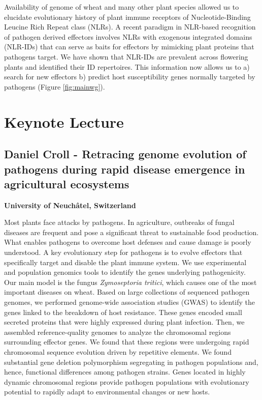 \documentclass[12pt,]{book}
\theoremstyle{definition}
\theoremstyle{definition}
\theoremstyle{remark}
\begin{document}
Availability of genome of wheat and many other plant species allowed us
to elucidate evolutionary history of plant immune receptors of
Nucleotide-Binding Leucine Rich Repeat class (NLRs). A recent paradigm
in NLR-based recognition of pathogen derived effectors involves NLRs
with exogenous integrated domains (NLR-IDs) that can serve as baits for
effectors by mimicking plant proteins that pathogens target. We have
shown that NLR-IDs are prevalent across flowering plants and identified
their ID repertoires. This information now allows us to a) search for
new effectors b) predict host susceptibility genes normally targeted by
pathogens (Figure \ref{fig:mainwg}).

\newpage

\section*{Keynote Lecture}\label{keynote-lecture-5}

\subsection*{Daniel Croll - Retracing genome evolution of pathogens
during rapid disease emergence in agricultural
ecosystems}\label{daniel-croll---retracing-genome-evolution-of-pathogens-during-rapid-disease-emergence-in-agricultural-ecosystems}

\textbf{University of Neuchâtel, Switzerland}

Most plants face attacks by pathogens. In agriculture, outbreaks of
fungal diseases are frequent and pose a significant threat to
sustainable food production. What enables pathogens to overcome host
defenses and cause damage is poorly understood. A key evolutionary step
for pathogens is to evolve effectors that specifically target and
disable the plant immune system. We use experimental and population
genomics tools to identify the genes underlying pathogenicity. Our main
model is the fungus \emph{Zymoseptoria tritici}, which causes one of the
most important diseases on wheat. Based on large collections of
sequenced pathogen genomes, we performed genome-wide association studies
(GWAS) to identify the genes linked to the breakdown of host resistance.
These genes encoded small secreted proteins that were highly expressed
during plant infection. Then, we assembled reference-quality genomes to
analyze the chromosomal regions surrounding effector genes. We found
that these regions were undergoing rapid chromosomal sequence evolution
driven by repetitive elements. We found substantial gene deletion
polymorphism segregating in pathogen populations and, hence, functional
differences among pathogen strains. Genes located in highly dynamic
chromosomal regions provide pathogen populations with evolutionary
potential to rapidly adapt to environmental changes or new hosts.
\end{document}
